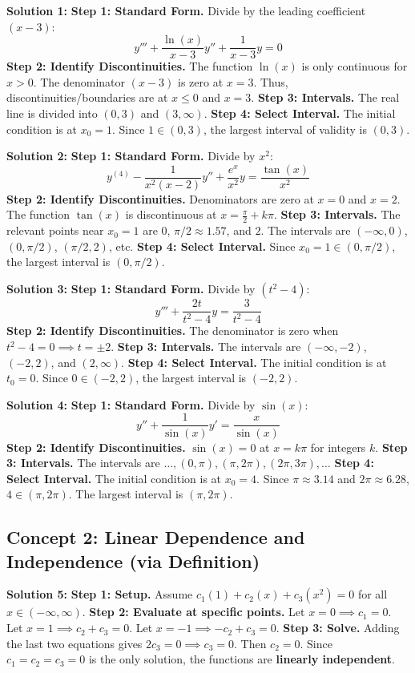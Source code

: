 \documentclass[12pt]{article}
\begin{document}
\textbf{Solution 1:}
\textbf{Step 1: Standard Form.} Divide by the leading coefficient $(x-3)$:
$$y''' + \frac{\ln(x)}{x-3}y'' + \frac{1}{x-3}y = 0$$
\textbf{Step 2: Identify Discontinuities.} The function $\ln(x)$ is only continuous for $x > 0$. The denominator $(x-3)$ is zero at $x=3$. Thus, discontinuities/boundaries are at $x \le 0$ and $x=3$.
\textbf{Step 3: Intervals.} The real line is divided into $(0, 3)$ and $(3, \infty)$.
\textbf{Step 4: Select Interval.} The initial condition is at $x_0 = 1$. Since $1 \in (0, 3)$, the largest interval of validity is \textbf{$(0, 3)$}.

\textbf{Solution 2:}
\textbf{Step 1: Standard Form.} Divide by $x^2$:
$$y^{(4)} - \frac{1}{x^2(x-2)} y'' + \frac{e^x}{x^2} y = \frac{\tan(x)}{x^2}$$
\textbf{Step 2: Identify Discontinuities.} Denominators are zero at $x=0$ and $x=2$. The function $\tan(x)$ is discontinuous at $x = \frac{\pi}{2} + k\pi$.
\textbf{Step 3: Intervals.} The relevant points near $x_0=1$ are $0$, $\pi/2 \approx 1.57$, and $2$. The intervals are $(-\infty, 0)$, $(0, \pi/2)$, $(\pi/2, 2)$, etc.
\textbf{Step 4: Select Interval.} Since $x_0 = 1 \in (0, \pi/2)$, the largest interval is \textbf{$(0, \pi/2)$}.

\textbf{Solution 3:}
\textbf{Step 1: Standard Form.} Divide by $(t^2-4)$:
$$y''' + \frac{2t}{t^2-4}y = \frac{3}{t^2-4}$$
\textbf{Step 2: Identify Discontinuities.} The denominator is zero when $t^2 - 4 = 0 \implies t = \pm 2$.
\textbf{Step 3: Intervals.} The intervals are $(-\infty, -2)$, $(-2, 2)$, and $(2, \infty)$.
\textbf{Step 4: Select Interval.} The initial condition is at $t_0 = 0$. Since $0 \in (-2, 2)$, the largest interval is \textbf{$(-2, 2)$}.

\textbf{Solution 4:}
\textbf{Step 1: Standard Form.} Divide by $\sin(x)$:
$$y'' + \frac{1}{\sin(x)}y' = \frac{x}{\sin(x)}$$
\textbf{Step 2: Identify Discontinuities.} $\sin(x) = 0$ at $x = k\pi$ for integers $k$.
\textbf{Step 3: Intervals.} The intervals are $\dots, (0, \pi), (\pi, 2\pi), (2\pi, 3\pi), \dots$
\textbf{Step 4: Select Interval.} The initial condition is at $x_0 = 4$. Since $\pi \approx 3.14$ and $2\pi \approx 6.28$, $4 \in (\pi, 2\pi)$. The largest interval is \textbf{$(\pi, 2\pi)$}.

\subsection*{Concept 2: Linear Dependence and Independence (via Definition)}

\textbf{Solution 5:}
\textbf{Step 1: Setup.} Assume $c_1(1) + c_2(x) + c_3(x^2) = 0$ for all $x \in (-\infty, \infty)$.
\textbf{Step 2: Evaluate at specific points.}
Let $x=0 \implies c_1 = 0$.
Let $x=1 \implies c_2 + c_3 = 0$.
Let $x=-1 \implies -c_2 + c_3 = 0$.
\textbf{Step 3: Solve.} Adding the last two equations gives $2c_3 = 0 \implies c_3 = 0$. Then $c_2 = 0$. Since $c_1=c_2=c_3=0$ is the only solution, the functions are \textbf{linearly independent}.
\end{document}
